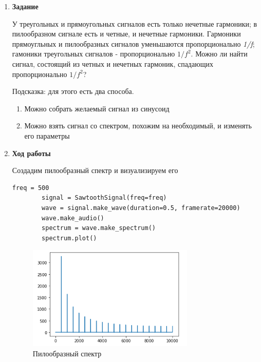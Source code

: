 \documentclass[a4paper,12pt]{article}
\begin{document}
\begin{enumerate}
	
	\item \textbf{Задание}
	
	У треугольных и прямоугольных сигналов есть только нечетные гармоники; в пилообразном сигнале есть и четные, и нечетные гармоники. Гармоники прямоугльных и пилообразных сигналов уменьшаются пропорционально \textit{1/f}; гамоники треугольных сигналов - пропорционально \textit{\(1/f^2\)}. Можно ли найти сигнал, состоящий из четных и нечетных гармоник, спадающих пропорционально \textit{\(1/f^2\)}?
	
	Подсказка: для этого есть два способа. 
	\begin{enumerate}
		
		\item Можно собрать желаемый сигнал из синусоид
		
		\item Можно взять сигнал со спектром, похожим на необходимый, и изменять его параметры
		
		
	\end{enumerate}
	
	\item \textbf{Ход работы}
	
	Создадим пилообразный спектр и визуализируем его
	\begin{lstlisting}[caption=Изменение спектра и визуализация результата]
		freq = 500
		signal = SawtoothSignal(freq=freq)
		wave = signal.make_wave(duration=0.5, framerate=20000)
		wave.make_audio()
		spectrum = wave.make_spectrum()
		spectrum.plot()
	\end{lstlisting}
	\begin{figure}[H]
		\centering
		\includegraphics[width=0.75\textwidth]{6_1.png}
		\caption{Пилообразный спектр}
		\label{fig:6.1}
	\end{figure}


\end{enumerate}
\end{document}
